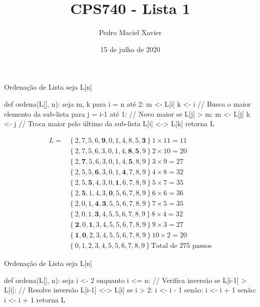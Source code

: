 \documentclass{homework}
\title{CPS740 - Lista 1}
\author{Pedro Maciel Xavier}
\date{15 de julho de 2020}
\begin{document}
	\maketitle
	
	\quest
	
	
	\subsubquest[Algoritmo]
	
	\begin{algor}{Ordenação de Lista}
	seja L[n]
	
	def ordena(L[], n):
		seja m, k
		para i = n até 2:
			m <- L[i]
			k <- i
			// Busca o maior elemento da sub-lista
			para j = i-1 até 1:
				// Novo maior
				se L[j] > m:
					m <- L[j]
					k <- j
			// Troca maior pelo último da sub-lista
			L[i] <-> L[k]
		retorna L
	\end{algor}

	\begin{align*}
	L = &\left\{2,7,5,6,\mathbf{9},0,1,4,8,5,\mathbf{3}\right\} 1 \times 11 = 11\\
	&\left\{2,7,5,6,3,0,1,4,\mathbf{8},\mathbf{5},9\right\} 2 \times 10 = 20\\
	&\left\{2,\mathbf{7},5,6,3,0,1,4,\mathbf{5},8,9\right\} 3 \times  9 = 27\\
	&\left\{2,5,5,\mathbf{6},3,0,1,\mathbf{4},7,8,9\right\} 4 \times  8 = 32\\
	&\left\{2,5,\mathbf{5},4,3,0,\mathbf{1},6,7,8,9\right\} 5 \times  7 = 35\\
	&\left\{2,\mathbf{5},1,4,3,\mathbf{0},5,6,7,8,9\right\} 6 \times  6 = 36\\
	&\left\{2,0,1,\mathbf{4},\mathbf{3},5,5,6,7,8,9\right\} 7 \times  5 = 35\\
	&\left\{2,0,1,\mathbf{3},4,5,5,6,7,8,9\right\} 8 \times  4 = 32\\
	&\left\{\mathbf{2},0,\mathbf{1},3,4,5,5,6,7,8,9\right\} 9 \times  3 = 27\\
	&\left\{\mathbf{1},\mathbf{0},2,3,4,5,5,6,7,8,9\right\}10 \times  2 = 20\\
	&\left\{0,1,2,3,4,5,5,6,7,8,9\right\} \text{Total de $275$ passos}
	\end{align*}
	
	\newpage
	
	
	\subsubquest[Algoritmo]
	\begin{algor}{Ordenação de Lista}
	seja L[n]
	
	def ordena(L[], n):
		seja i <- 2
		enquanto i <= n:
			// Verifica inversão
			se L[i-1] > L[i]:
				// Resolve inversão
				L[i-1] <-> L[i]
				se i > 2:
					i <- i - 1
				senão:
					i <- i + 1
			senão:
				i <- i + 1
		retorna L
	\end{algor}
\end{document}

